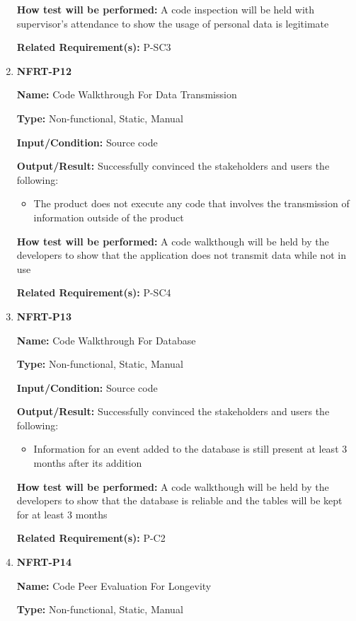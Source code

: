 \documentclass[12pt, titlepage]{article}
\begin{document}
\begin{enumerate}
\textbf{How test will be performed:} A code inspection will be held with supervisor's attendance to show the usage of personal data is legitimate

\textbf{Related Requirement(s):} P-SC3

\item{\textbf{NFRT-P12}}

\textbf{Name:} Code Walkthrough For Data Transmission

\textbf{Type:} Non-functional, Static, Manual

\textbf{Input/Condition:} Source code

\textbf{Output/Result:} Successfully convinced the stakeholders and users the following:
\begin{itemize}
  \item The product does not execute any code that involves the transmission of information outside of the product
\end{itemize}

\textbf{How test will be performed:}  A code walkthough will be held by the developers to show that the application does not transmit data while not in use

\textbf{Related Requirement(s):} P-SC4

\item{\textbf{NFRT-P13}}

\textbf{Name:} Code Walkthrough For Database

\textbf{Type:} Non-functional, Static, Manual

\textbf{Input/Condition:} Source code

\textbf{Output/Result:} Successfully convinced the stakeholders and users the following:
\begin{itemize}
  \item Information for an event added to the database is still present at least 3 months after its addition
\end{itemize}

\textbf{How test will be performed:} A code walkthough will be held by the developers to show that the database is reliable and the tables will be kept for at least 3 months

\textbf{Related Requirement(s):} P-C2

\item{\textbf{NFRT-P14}}

\textbf{Name:} Code Peer Evaluation For Longevity

\textbf{Type:} Non-functional, Static, Manual


\end{enumerate}
\end{document}
